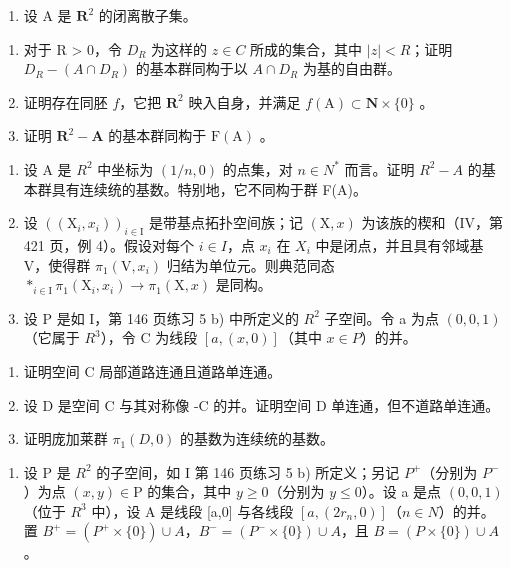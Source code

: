 \exercisegroup

\begin{enumerate}
\def\labelenumi{\arabic{enumi})}
\tightlist
\item
  设 A 是 \(\mathbf{R}^2\) 的闭离散子集。
\end{enumerate}

\begin{enumerate}
\def\labelenumi{\alph{enumi})}
\item
  对于 R \textgreater{} 0，令 \(D_{R}\) 为这样的 \(z \in C\) 所成的集合，其中 \(|z| < R\)；证明 \(D_{R} - (A \cap D_{R})\) 的基本群同构于以 \(A \cap D_{R}\) 为基的自由群。
\item
  证明存在同胚 \(f\)，它把 \(\mathbf{R}^{2}\) 映入自身，并满足 \(f(\mathrm{A})\subset\mathbf{N}\times\{0\}\) 。
\item
  证明 \(\mathbf{R}^2 - \mathbf{A}\) 的基本群同构于 \(\mathrm{F(A)}\) 。
\end{enumerate}

\begin{enumerate}
\def\labelenumi{\arabic{enumi})}
\setcounter{enumi}{1}
\item
  设 A 是 \(R^{2}\) 中坐标为 \((1/n,0)\) 的点集，对 \(n\in N^{*}\) 而言。证明 \(R^{2}-A\) 的基本群具有连续统的基数。特别地，它不同构于群 F(A)。
\item
  设 \(((\mathrm{X}_{i}, x_{i}))_{i \in \mathrm{I}}\) 是带基点拓扑空间族；记 \((\mathrm{X}, x)\) 为该族的楔和（IV，第 421 页，例 4）。假设对每个 \(i \in I\)，点 \(x_{i}\) 在 \(X_{i}\) 中是闭点，并且具有邻域基 V，使得群 \(\pi_{1}(\mathrm{V}, x_{i})\) 归结为单位元。则典范同态 \(*_{i \in \mathrm{I}} \pi_{1}(\mathrm{X}_{i}, x_{i}) \to \pi_{1}(\mathrm{X}, x)\) 是同构。
\item
  设 P 是如 I，第 146 页练习 5 b) 中所定义的 \(R^{2}\) 子空间。令 a 为点 \((0,0,1)\)（它属于 \(R^{3}\)），令 C 为线段 \([a,(x,0)]\)（其中 \(x \in P\)）的并。
\end{enumerate}

\begin{enumerate}
\def\labelenumi{\alph{enumi})}
\item
  证明空间 C 局部道路连通且道路单连通。
\item
  设 D 是空间 C 与其对称像 -C 的并。证明空间 D 单连通，但不道路单连通。
\item
  证明庞加莱群 \(\pi_{1}(D,0)\) 的基数为连续统的基数。
\end{enumerate}

\begin{enumerate}
\def\labelenumi{\arabic{enumi})}
\setcounter{enumi}{4}
\tightlist
\item
  设 P 是 \(R^{2}\) 的子空间，如 I 第 146 页练习 5 b) 所定义；另记 \(P^{+}\)（分别为 \(P^{-}\)）为点 \((x,y)\in\mathrm{P}\) 的集合，其中 \(y\geqslant0\)（分别为 \(y\leqslant0\)）。设 a 是点 \((0,0,1)\)（位于 \(R^{3}\) 中），设 A 是线段 [a,0] 与各线段 \([a,(2r_{n},0)]\)（\(n\in N\)）的并。置 \(B^{+}=(P^{+}\times\{0\})\cup A\)，\(B^{-}=(P^{-}\times\{0\})\cup A\)，且 \(B=(P\times\{0\})\cup A\)。
\end{enumerate}

